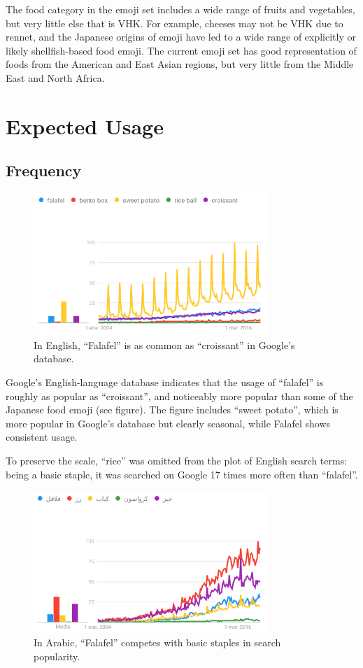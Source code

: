 \documentclass[a4paper,10pt]{article}
\begin{document}
The food category in the emoji set includes a wide range of fruits and vegetables, but
very little else that is VHK. For example, cheeses may not be VHK due to rennet, and the
Japanese origins of emoji have led to a wide range of explicitly or likely
shellfish-based food emoji. The current emoji set has good representation of foods
from the American and East Asian regions, but very little from the Middle East and
North Africa.

\section{Expected Usage}

\subsection{Frequency}

\begin{figure}
\begin{center}
\includegraphics[width=3.5in]{trends.png}
\end{center}
\caption{In English, ``Falafel'' is as common as ``croissant'' in Google's database.}
\label{engplot}
\end{figure}


Google's English-language database indicates that the usage of ``falafel'' is roughly as popular as ``croissant'', and noticeably more popular than some of the Japanese food emoji (see figure). 
The figure includes ``sweet potato'', which is more popular in Google's database but clearly seasonal, while Falafel shows consistent usage.

To preserve the scale, ``rice'' was omitted from the plot of English search terms:
being a basic staple, it was searched on Google 17 times more often than ``falafel''.

\begin{figure}
\begin{center}
\includegraphics[width=3.5in]{atrends.png}
\end{center}
\caption{In Arabic, ``Falafel'' competes with basic staples in search popularity.}
\label{arabplot}
\end{figure}
\end{document}
